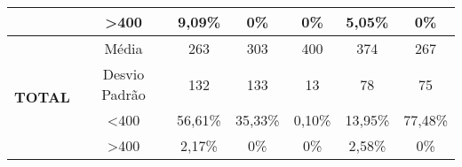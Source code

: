 \begin{table}[]
\begin{tabular}{|c|c|ccccc|}
                                & \textgreater 400 & 9,09\%            & 0\%            & 0\%            & 5,05\%            & 0\%            \\ \hline
\multirow{4}{*}{\textbf{TOTAL}} & Média            & 263               & 303               & 400               & 374               & 267               \\
                                & Desvio Padrão    & 132               & 133               & 13                & 78                & 75                \\
                                & \textless 400    & 56,61\%           & 35,33\%           & 0,10\%            & 13,95\%           & 77,48\%           \\
                                & \textgreater 400 & 2,17\%            & 0\%            & 0\%            & 2,58\%            & 0\%            \\ \hline
\end{tabular}
\end{table}
